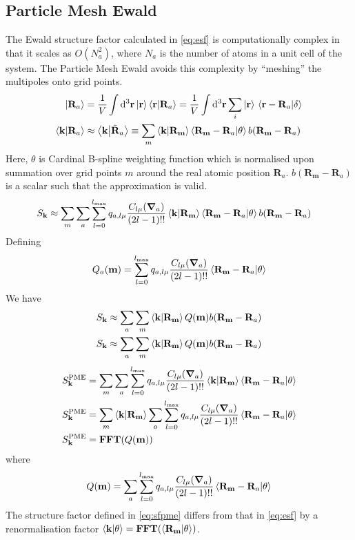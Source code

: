 \documentclass[12pt]{extarticle}
\renewcommand{\bf}{\mathbf}
\begin{document}
    \subsection{Particle Mesh Ewald}
    The Ewald structure factor calculated in \cref{eq:esf} is computationally complex in that it scales as \(O(N_a^2)\), where \(N_a\) is the number of atoms in a unit cell of the system. The Particle Mesh Ewald avoids this complexity by ``meshing'' the multipoles onto grid points. \begin{align*}
        \ket{\bf R_a} &= \frac{1}{V}\int \dd[3]{\bf r} \ket{\bf r} \bra{\bf r} \ket{\bf R_a} = \frac{1}{V}\int \dd[3]{\bf r}\sum_i \ket{\bf r} \bra*{\bf r -\bf  R_a}\ket*{\delta}\\
        \bra{\bf k}\ket{\bf R_a} &\approx \bra{\bf k}\ket{\tilde{\bf R}_a} \equiv \sum_m \bra{\bf k}\ket{\bf R_{\bf m}} \bra{\bf R_{\bf m} - \bf R_a} \ket{\theta} b(\bf R_{\bf m} - \bf R_a)
    \end{align*}
    Here, \(\theta\) is Cardinal B-spline weighting function which is normalised upon summation over grid points \(m\) around the real atomic position \(\bf R_a\). \(b(\bf R_{\bf m} - \bf R_a)\) is a scalar such that the approximation is valid.\begin{align}
        S_{\bf k} & \approx \sum_m \sum_{a} \sum_{l = 0}^{l_{\max}} q_{a, l \mu} \frac{C_{l \mu} (\grad_a)}{(2l - 1)!!}  \bra{\bf k}\ket{\bf R_{\bf m}} \bra{\bf R_{\bf m} - \bf R_a} \ket{\theta} b(\bf R_{\bf m} - \bf R_a) 
    \end{align}
    Defining \[
        Q_a(\bf m) = \sum_{l = 0}^{l_{\max}} q_{a, l \mu} \frac{C_{l \mu} (\grad_a)}{(2l - 1)!!} \bra{\bf R_{\bf m} - \bf R_a} \ket{\theta}
    \]
    We have \begin{align*}
        S_{\bf k} & \approx \sum_a \sum_m \bra{\bf k}\ket{\bf R_{\bf m}} Q(\bf m) b(\bf R_{\bf m} - \bf R_a) \\
        S_{\bf k} & \approx \sum_a \sum_m \bra{\bf k}\ket{\bf R_{\bf m}} Q(\bf m) b(\bf R_{\bf m} - \bf R_a) \\
    \end{align*}
    \begin{align}
        S^\text{PME}_{\bf k} &= \sum_m \sum_{a} \sum_{l = 0}^{l_{\max}} q_{a, l \mu} \frac{C_{l \mu} (\grad_a)}{(2l - 1)!!} \bra{\bf k} \ket{\bf R_{\bf m}} \bra{\bf R_{\bf m} - \bf R_a} \ket{\theta}\nonumber\\
        S^\text{PME}_{\bf k} &=  \sum_m  \bra{\bf k} \ket{\bf R_{\bf m}} \sum_{a} \sum_{l = 0}^{l_{\max}} q_{a, l \mu} \frac{C_{l \mu} (\grad_a)}{(2l - 1)!!} \bra{\bf R_{\bf m} - \bf R_a} \ket{\theta}\nonumber\\
        S^\text{PME}_{\bf k} &=  \mathbf{FFT} \pqty{ Q(\bf m)}
        \label{eq:sfpme}
    \end{align}
    where \[
        Q(\bf m) = \sum_{a} \sum_{l = 0}^{l_{\max}} q_{a, l \mu} \frac{C_{l \mu} (\grad_a)}{(2l - 1)!!} \bra{\bf R_{\bf m} - \bf R_a} \ket{\theta}
    \]
    The structure factor defined in \cref{eq:sfpme} differs from that in \cref{eq:esf} by a renormalisation factor \(\bra{\bf k} \ket{\theta} = \textbf{FFT} \pqty{\bra{\bf R_{\bf m}} \ket{\theta}}\).
\end{document}
